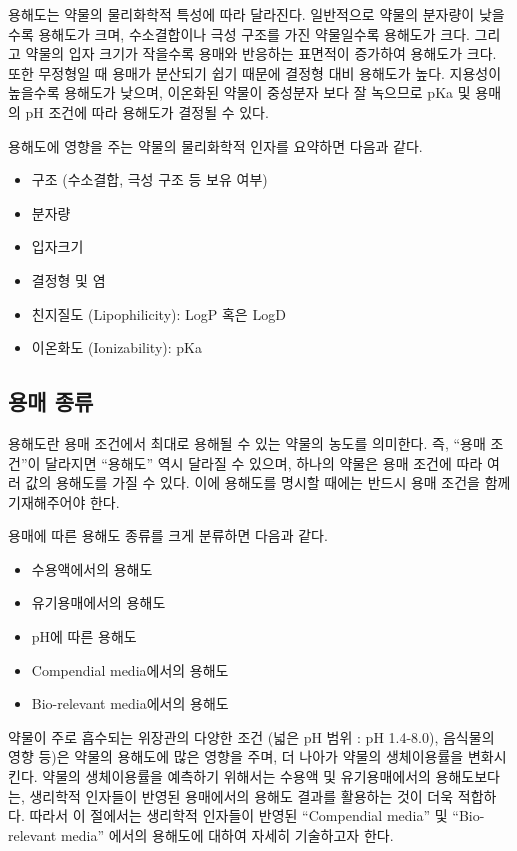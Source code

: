 \documentclass[
  11pt,
  krantz2, a4paper, twoside]{krantz}
\providecommand{\tightlist}{%
  \setlength{\itemsep}{0pt}\setlength{\parskip}{0pt}}
\begin{document}
용해도는 약물의 물리화학적 특성에 따라 달라진다. 일반적으로 약물의 분자량이 낮을수록 용해도가 크며, 수소결합이나 극성 구조를 가진 약물일수록 용해도가 크다.
그리고 약물의 입자 크기가 작을수록 용매와 반응하는 표면적이 증가하여 용해도가 크다.
또한 무정형일 때 용매가 분산되기 쉽기 때문에 결정형 대비 용해도가 높다.
지용성이 높을수록 용해도가 낮으며, 이온화된 약물이 중성분자 보다 잘 녹으므로 pKa 및 용매의 pH 조건에 따라 용해도가 결정될 수 있다.

용해도에 영향을 주는 약물의 물리화학적 인자를 요약하면 다음과 같다.

\begin{itemize}
\tightlist
\item
  구조 (수소결합, 극성 구조 등 보유 여부)
\item
  분자량
\item
  입자크기
\item
  결정형 및 염
\item
  친지질도 (Lipophilicity): LogP 혹은 LogD
\item
  이온화도 (Ionizability): pKa
\end{itemize}

\subsection{용매 종류}\label{uxc6a9uxb9e4-uxc885uxb958}

용해도란 용매 조건에서 최대로 용해될 수 있는 약물의 농도를 의미한다.
즉, ``용매 조건''이 달라지면 ``용해도'' 역시 달라질 수 있으며, 하나의 약물은 용매 조건에 따라 여러 값의 용해도를 가질 수 있다.
이에 용해도를 명시할 때에는 반드시 용매 조건을 함께 기재해주어야 한다.

용매에 따른 용해도 종류를 크게 분류하면 다음과 같다.

\begin{itemize}
\tightlist
\item
  수용액에서의 용해도
\item
  유기용매에서의 용해도
\item
  pH에 따른 용해도
\item
  Compendial media에서의 용해도
\item
  Bio-relevant media에서의 용해도
\end{itemize}

약물이 주로 흡수되는 위장관의 다양한 조건 (넓은 pH 범위 : pH 1.4-8.0), 음식물의 영향 등)은 약물의 용해도에 많은 영향을 주며, 더 나아가 약물의 생체이용률을 변화시킨다.
약물의 생체이용률을 예측하기 위해서는 수용액 및 유기용매에서의 용해도보다는, 생리학적 인자들이 반영된 용매에서의 용해도 결과를 활용하는 것이 더욱 적합하다. 따라서 이 절에서는 생리학적 인자들이 반영된 ``Compendial media'' 및 ``Bio-relevant media'' 에서의 용해도에 대하여 자세히 기술하고자 한다.
\end{document}
